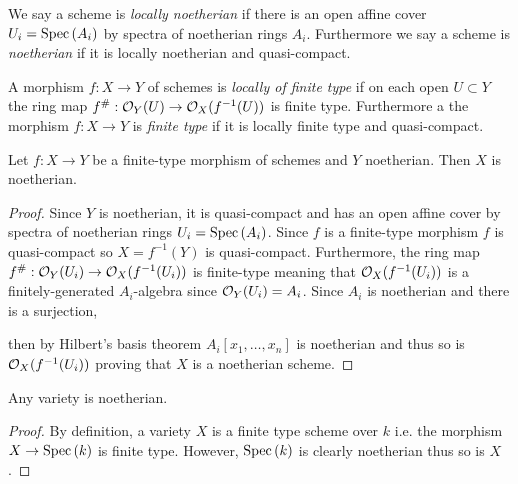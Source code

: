 \documentclass[12pt]{article}
\begin{document}
\begin{definition}
We say a scheme is \textit{locally noetherian} if there is an open affine cover $U_i = \mathrm{Spec}\left( A_i \right)$ by spectra of noetherian rings $A_i$. Furthermore we say a scheme is \textit{noetherian} if it is locally noetherian and quasi-compact.
\end{definition}

\begin{definition}
A morphism $f : X \to Y$ of schemes is \textit{locally of finite type} if on each open $U \subset Y$ the ring map $f^\# : \mathcal{O}_{Y}(U) \to \mathcal{O}_{X}(f^{-1}(U))$ is finite type. Furthermore a the morphism $f :  X \to Y$ is \textit{finite type} if it is locally finite type and quasi-compact.
\end{definition}

\begin{lemma}
Let $f : X \to Y$ be a finite-type morphism of schemes and $Y$ noetherian. Then $X$ is noetherian.
\end{lemma}

\begin{proof}
Since $Y$ is noetherian, it is quasi-compact and has an open affine cover by spectra of noetherian rings $U_i = \mathrm{Spec}\left( A_i \right)$. Since $f$ is a finite-type morphism $f$ is quasi-compact so $X = f^{-1}(Y)$ is quasi-compact. Furthermore, the ring map $f^\# : \mathcal{O}_{Y}(U_i) \to \mathcal{O}_{X}(f^{-1}(U_i))$ is finite-type meaning that $\mathcal{O}_{X}(f^{-1}(U_i))$ is a finitely-generated $A_i$-algebra since $\mathcal{O}_{Y}(U_i) = A_i$. Since $A_i$ is noetherian and there is a surjection, \begin{center}
\end{center}
then by Hilbert's basis theorem $A_i[x_1, \dots, x_n]$ is noetherian and thus so is $\mathcal{O}_{X}(f^{-1}(U_i))$ proving that $X$ is a noetherian scheme. 
\end{proof}

\begin{corollary}
Any variety is noetherian.
\end{corollary}

\begin{proof}
By definition, a variety $X$ is a finite type scheme over $k$ i.e. the morphism $X \to \mathrm{Spec}\left( k \right)$ is finite type. However, $\mathrm{Spec}\left( k \right)$ is clearly noetherian thus so is $X$.
\end{proof}
\end{document}
